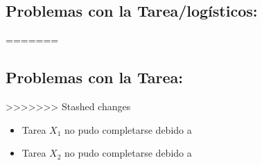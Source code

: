 \documentclass{article}
\begin{document}
\subsection{Problemas con la Tarea/logísticos:}
\label{sec:orgbbe5687}
=======
\subsection{Problemas con la Tarea:}
\label{sec:org0aaf427}
>>>>>>> Stashed changes
\begin{itemize}
\item Tarea \(X_1\) no pudo completarse debido a
\item Tarea \(X_2\) no pudo completarse debido a
\end{itemize}
\end{document}
